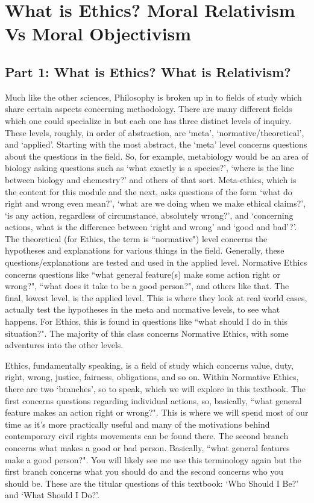 \part{What is Ethics? Moral Relativism Vs Moral Objectivism}
\label{ch.modone}
\chapter{Part 1: What is Ethics? What is Relativism?}
Much like the other sciences, Philosophy is broken up in to fields of study which share certain aspects concerning methodology. There are many different fields which one could specialize in but each one has three distinct levels of inquiry. These levels, roughly, in order of abstraction, are `meta', `normative/theoretical', and `applied'. Starting with the most abstract, the `meta' level concerns questions about the questions in the field. So, for example, metabiology would be an area of biology asking questions such as `what exactly is a species?', `where is the line between biology and chemestry?' and others of that sort. Meta-ethics, which is the content for this module and the next, asks questions of the form `what do right and wrong even mean?', `what are we doing when we make ethical claims?', `is any action, regardless of circumstance, absolutely wrong?', and `concerning actions, what is the difference between `right and wrong' and `good and bad'?'. The theoretical (for Ethics, the term is ``normative") level concerns the hypotheses and explanations for various things in the field. Generally, these questions/explanations are tested and used in the applied level. Normative Ethics concerns questions like ``what general feature(s) make some action right or wrong?", ``what does it take to be a good person?", and others like that.  The final, lowest level, is the applied level. This is where they look at real world cases, actually test the hypotheses in the meta and normative levels, to see what happens. For Ethics, this is found in questions like ``what should I do in this situation?". The majority of this class concerns Normative Ethics, with some adventures into the other levels. 

Ethics, fundamentally speaking, is a field of study which concerns value, duty, right, wrong, justice, fairness, obligations, and so on.  Within Normative Ethics, there are two `branches', so to speak, which we will explore in this textbook. The first concerns questions regarding individual actions, so, basically, ``what general feature makes an action right or wrong?". This is where we will spend most of our time as it's more practically useful and many of the motivations behind contemporary civil rights movements can be found there. The second branch concerns what makes a good or bad person. Basically, ``what general features make a good person?". You will likely see me use this terminology again but the first branch concerns what you should do and the second concerns who you should be. These are the titular questions of this textbook: `Who Should I Be?' and `What Should I Do?'.

